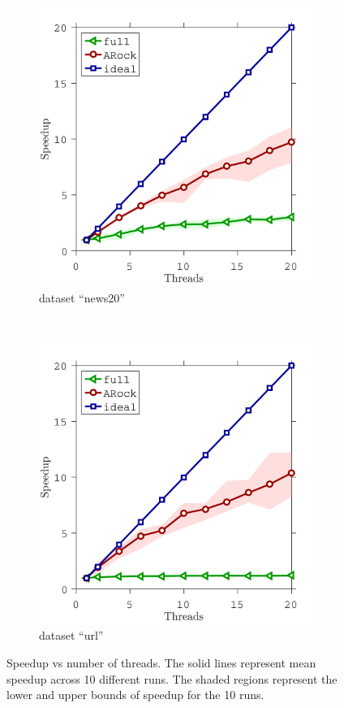 \begin{figure}[!h]
        \centering
       \begin{subfigure}[b]{0.35\textwidth}
                \includegraphics[width=\textwidth]{./figs/news20_speedup}
                \caption{dataset ``news20''}
        \end{subfigure}
        ~~
        \begin{subfigure}[b]{0.35\textwidth}
                \includegraphics[width=\textwidth]{./figs/url_speedup}
                \caption{dataset ``url''}
        \end{subfigure}        
        \caption{Speedup vs number of threads. The solid lines represent mean speedup across 10 different runs. The shaded regions represent the lower and upper bounds of speedup for the 10 runs.}\label{fig:log_reg_speedup}
\end{figure}
